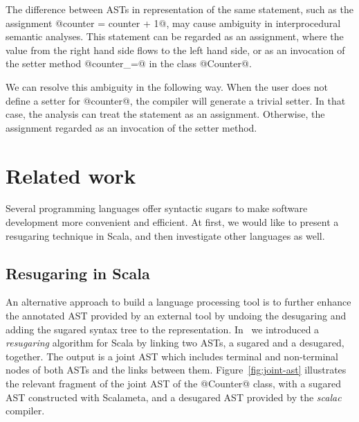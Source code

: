 \documentclass[11pt]{amsart}
\begin{document}

The difference between ASTs in representation of the same statement,
such as the assignment @counter = counter + 1@, may cause ambiguity in
interprocedural semantic analyses. This statement can be regarded as
an assignment, where the value from the right hand side flows to the
left hand side, or as an invocation of the setter method @counter_=@
in the class @Counter@.

We can resolve this ambiguity in the following way. When the user does
not define a setter for @counter@, the compiler will generate a
trivial setter. In that case, the analysis can treat the statement as
an assignment. Otherwise, the assignment regarded as an invocation of
the setter method.

\section{Related work}
\label{sec:related}
Several programming languages offer syntactic sugars to make software
development more convenient and efficient. At first, we would like to present a
resugaring technique in Scala, and then investigate other languages as
well.

\subsection{Resugaring in Scala}

An alternative approach to build a language processing tool is to
further enhance the annotated AST provided by an external tool by
undoing the desugaring and adding the sugared syntax tree to the
representation. In~\cite{sclit17} we introduced a \emph{resugaring} algorithm
for Scala by linking two ASTs, a sugared and a desugared,
together. The output is a joint AST which includes terminal and
non-terminal nodes of both ASTs and the links between them.
Figure~\ref{fig:joint-ast} illustrates the relevant fragment of the
joint AST of the @Counter@ class, with a sugared AST constructed with
Scalameta, and a desugared AST provided by the \emph{scalac} compiler.
\end{document}
